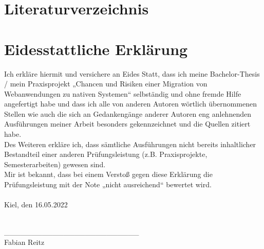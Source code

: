 \documentclass[a4paper]{scrartcl}
\begin{document}

\section*{Literaturverzeichnis}

\singlespacing


\printbibliography[heading=none]

\newpage


\section*{Eidesstattliche Erklärung}


\onehalfspacing

Ich erkläre hiermit und versichere an Eides Statt, dass ich meine Bachelor-Thesis / mein Praxisprojekt „Chancen und Risiken einer Migration von Webanwendungen zu nativen Systemen“ selbständig und ohne fremde Hilfe angefertigt habe und dass ich alle von anderen Autoren wörtlich übernommenen Stellen wie auch die sich an Gedankengänge anderer Autoren eng anlehnenden Ausführungen meiner Arbeit besonders gekennzeichnet und die Quellen zitiert habe. \\
Des Weiteren erkläre ich, dass sämtliche Ausführungen nicht bereits inhaltlicher Bestandteil einer anderen Prüfungsleistung (z.B. Praxisprojekte, Semesterarbeiten) gewesen sind. \\
Mir ist bekannt, dass bei einem Verstoß gegen diese Erklärung die Prüfungsleistung mit der Note „nicht ausreichend“ bewertet wird. \\ \\

Kiel, den 16.05.2022 \\ \\ 

\begin{tabbing}
	\_\_\_\_\_\_\_\_\_\_\_\_\_\_\_\_\_\_\_\_\_\_\_\_\_ \\
	Fabian Reitz
\end{tabbing}
\end{document}
